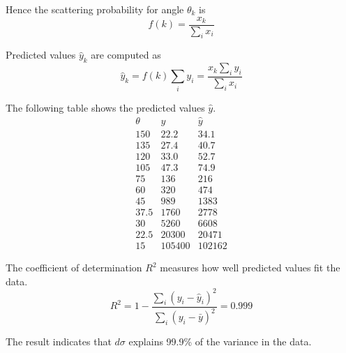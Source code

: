 Hence the scattering probability for angle $\theta_k$ is
\begin{equation*}
f(k)=\frac{x_k}{\sum_i x_i}
\end{equation*}

Predicted values $\hat y_k$ are computed as
\begin{equation*}
\hat y_k=f(k)\sum_i y_i=\frac{x_k\sum_i y_i}{\sum_i x_i}
\end{equation*}

The following table shows the predicted values $\hat y$.
\begin{equation*}
\begin{matrix}
\theta & y & \hat y\\
150 & 22.2 & 34.1\\
135 & 27.4 & 40.7\\
120 & 33.0 & 52.7\\
105 & 47.3 & 74.9\\
75 & 136 & 216\\
60 & 320 & 474\\
45 & 989 & 1383\\
37.5 & 1760 & 2778\\
30 & 5260 & 6608\\
22.5 & 20300 & 20471\\
15 & 105400 & 102162
\end{matrix}
\end{equation*}

The coefficient of determination $R^2$ measures how well predicted values fit the data.
\begin{equation*}
R^2=1-\frac{\sum_i(y_i-\hat y_i)^2}{\sum_i(y_i-\bar y)^2}=0.999
\end{equation*}

The result indicates that $d\sigma$ explains 99.9\%
of the variance in the data.


